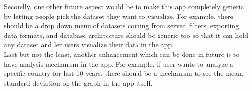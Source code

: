 Secondly, one other future aspect would be to make this app completely generic by letting people pick the dataset they want to visualize. For example, there should be a drop down menu of datasets coming from server, filters, exporting data formats, and database architecture should be generic too so that it can hold any dataset and ler users visualize their data in the app. \\

Last but not the least, another enhancement which can be done in future is to have analysis mechanism in the app. For example, if user wants to analyze a specific country for last 10 years, there should be a mechanism to see the mean, standard deviation on the graph in the app itself. 
